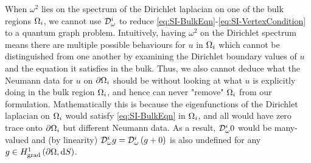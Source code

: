 When $\omega^2$ lies on the spectrum of the Dirichlet laplacian on one of the bulk regions $\Omega_i$, we cannot use $\mathcal{D}^i_{\omega}$ to reduce \eqref{eq:SI-BulkEqn}-\eqref{eq:SI-VertexCondition} to a quantum graph problem.
Intuitively, having $\omega^2$ on the Dirichlet spectrum means there are multiple possible behaviours for $u$ in $\Omega_i$ which cannot be distinguished from one another by examining the Dirichlet boundary values of $u$ and the equation it satisfies in the bulk.
Thus, we also cannot deduce what the Neumann data for $u$ on $\partial\Omega_i$ should be without looking at what $u$ is explicitly doing in the bulk region $\Omega_i$, and hence can never "remove" $\Omega_i$ from our formulation.
Mathematically this is because the eigenfunctions of the Dirichlet laplacian on $\Omega_i$ would satisfy \eqref{eq:SI-BulkEqn} in $\Omega_i$, and all would have zero trace onto $\partial\Omega_i$ but different Neumann data.
As a result, $\mathcal{D}^i_\omega 0$ would be many-valued and (by linearity) $\mathcal{D}^i_\omega g = \mathcal{D}^i_\omega\left( g+0 \right)$ is also undefined for any $g\in H^1_\mathrm{grad}\left( \partial\Omega, \mathrm{d}S \right)$.

